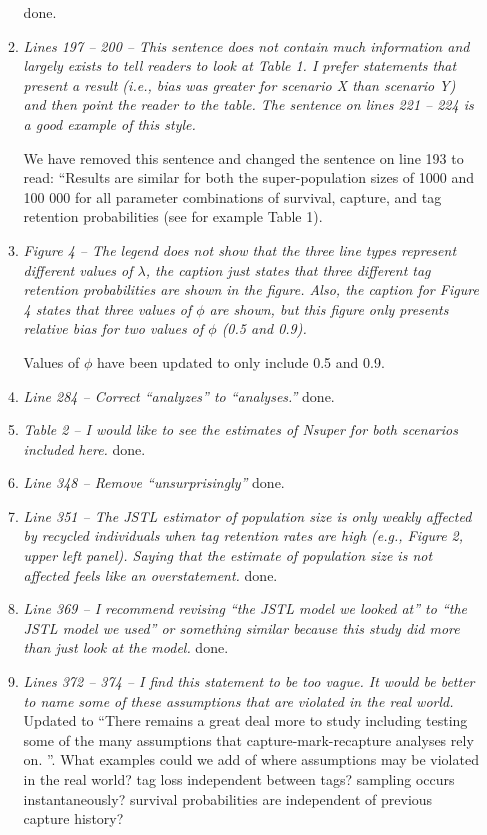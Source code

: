 \documentclass[12pt]{article}
\begin{document}
\begin{enumerate}
\begin{enumerate}
done.

\item {\it Lines 197 – 200 – This sentence does not contain much information and largely exists to tell readers to look at Table 1. I prefer statements that present a result (i.e., bias was greater for scenario X than scenario Y) and then point the reader to the table. The sentence on lines 221 – 224 is a good example of this style.}

We have removed this sentence and changed the sentence on line 193 to read: ``Results are similar for both the super-population sizes of 1000 and 100 000 for all parameter combinations of survival, capture, and tag retention probabilities (see for example Table 1).


\item \textit{Figure 4 – The legend does not show that the three line types represent different values of $\lambda$, the caption just states that three different tag retention probabilities are shown in the figure. Also, the caption for Figure 4 states that three values of $\phi$ are shown, but this figure only presents relative bias for two values of $\phi$ (0.5 and 0.9).}

Values of $\phi$ have been updated to only include 0.5 and 0.9. 

\item {\it Line 284 – Correct “analyzes” to “analyses.”} 
done.

\item {\it Table 2 – I would like to see the estimates of Nsuper for both scenarios included here.}
done.

\item {\it Line 348 – Remove “unsurprisingly”} 
done.

\item {\it Line 351 – The JSTL estimator of population size is only weakly affected by recycled individuals when tag retention rates are high (e.g., Figure 2, upper left panel). Saying that the estimate of population size is not affected feels like an overstatement.} 
done.

\item {\it Line 369 – I recommend revising “the JSTL model we looked at” to “the JSTL model we used” or something similar because this study did more than just look at the model.} 
done.

\item {\it Lines 372 – 374 – I find this statement to be too vague. It would be better to name some of these assumptions that are violated in the real world.}
Updated to ``There remains a great deal more to study including testing some of the many assumptions that capture-mark-recapture analyses rely on. ''.  What examples could we add of where assumptions may be violated in the real world? tag loss independent between tags? sampling occurs instantaneously? survival probabilities are independent of previous capture history? 


\end{enumerate}
\end{enumerate}
\end{document}
